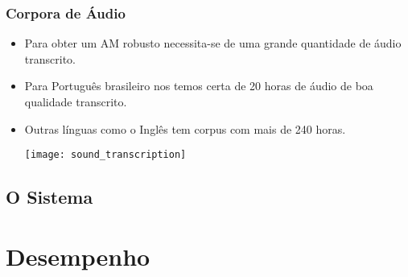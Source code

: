 \documentclass{beamer}
\begin{document}

\begin{frame}
   \frametitle{Corpora de Áudio}
   \begin{itemize}
      \item Para obter um AM robusto necessita-se de uma grande
      quantidade de áudio transcrito.
      \item Para Português brasileiro nos temos certa de 20 horas
      de áudio de boa qualidade transcrito.
      \item Outras línguas como o Inglês tem corpus com mais de 240 horas.
      \begin{center}
	 \texttt{[image: sound\_transcription]}
      \end{center}
   \end{itemize}
\end{frame}

\subsection{O Sistema}

\section{Desempenho}
\end{document}
